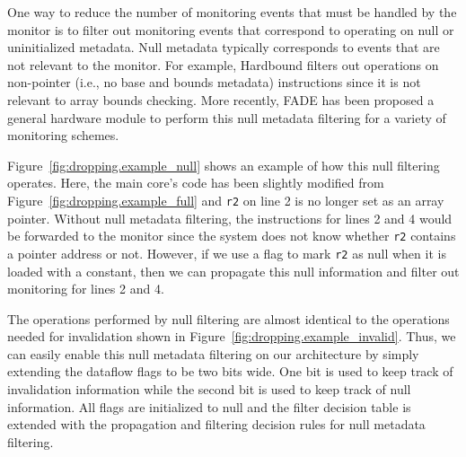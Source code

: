 One way to reduce the number of monitoring events that must be handled by the
monitor is to filter out monitoring events that correspond to operating on null
or uninitialized metadata. Null metadata typically corresponds to events that
are not relevant to the monitor. For example, Hardbound
\cite{hardbound-asplos08} filters out operations on non-pointer (i.e., no base
and bounds metadata) instructions since it is not relevant to array bounds
checking. More recently, FADE \cite{fade-hpca14} has been proposed a general
hardware module to perform this null metadata filtering for a variety of
monitoring schemes. 

Figure~\ref{fig:dropping.example_null} shows an example of how this null filtering operates.
Here, the main core's code has been slightly modified from
Figure~\ref{fig:dropping.example_full} and {\tt r2} on line 2 is no longer set as an array pointer.
Without null metadata filtering, the instructions for lines 2 and 4 would be
forwarded to the monitor since the system does not know whether {\tt r2}
contains a pointer address or not. However, if we use a flag to mark {\tt r2}
as null when it is loaded with a constant, then we can propagate this null
information and filter out monitoring for lines 2 and 4.

The operations performed by null filtering are almost identical to the
operations needed for invalidation shown in
Figure~\ref{fig:dropping.example_invalid}.
Thus, we can easily enable this null metadata filtering on our architecture by
simply extending the dataflow flags to be two bits wide. One bit is used to
keep track of invalidation information while the second bit is used to keep
track of null information. All flags are initialized to null and the filter
decision table is extended with the propagation and filtering decision rules
for null metadata filtering.

